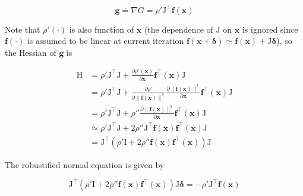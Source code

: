 \begin{equation}
    \bm{g} \doteq \nabla G = \rho' \mathrm{J}^\top \mathbf{f}(\bm{x})
\end{equation}

Note that $\rho'(\cdot)$ is also function of $\bm{x}$ (the dependence of $\mathrm{J}$ on $\bm{x}$ is ignored since $\mathbf{f}(\cdot)$ is assumed to be linear at current iteration $\mathbf{f}(\bm{x} + \bm{\delta}) \simeq \mathbf{f}(\bm{x}) + \mathrm{J}\bm{\delta}$), so the Hessian of $\bm{g}$ is

\begin{equation}
\begin{aligned}
    \mathrm{H}
           &=
              \rho' \mathrm{J}^\top \mathrm{J} +
              \frac{\partial\rho'(\bm{x})}{\partial\bm{x}}
              \mathbf{f}^\top(\bm{x})\mathrm{J} \\
           &=
              \rho' \mathrm{J}^\top \mathrm{J} +
              \frac{\partial\rho'}{\partial\lVert\mathbf{f}(\bm{x})\rVert^2}
              \frac{\partial\lVert\mathbf{f}(\bm{x})\rVert^2}{\partial\bm{x}}
              \mathbf{f}^\top(\bm{x}) \mathrm{J} \\
           &=
              \rho' \mathrm{J}^\top \mathrm{J} + \rho''
              \frac{\partial\lVert\mathbf{f}(\bm{x})\rVert^2}{\partial\bm{x}}
              \mathbf{f}^\top(\bm{x}) \mathrm{J} \\
           &\simeq
              \rho' \mathrm{J}^\top \mathrm{J} + 2\rho''
              \mathrm{J}^\top \mathbf{f}(\bm{x}) \mathbf{f}^\top(\bm{x}) \mathrm{J} \\
           &=
              \mathrm{J}^\top \left(
                  \rho'\mathrm{I} + 2\rho''
                  \mathbf{f}(\bm{x}) \mathbf{f}^\top(\bm{x})
              \right) \mathrm{J}
\end{aligned}
\end{equation}

The robustified normal equation is given by

\begin{equation}
    \mathrm{J}^\top \left(
        \rho'\mathrm{I} + 2\rho''
        \mathbf{f}(\bm{x}) \mathbf{f}^\top(\bm{x})
    \right) \mathrm{J} \bm{\delta}
    =
    -\rho' \mathrm{J}^\top \mathbf{f}(\bm{x})
\end{equation}
